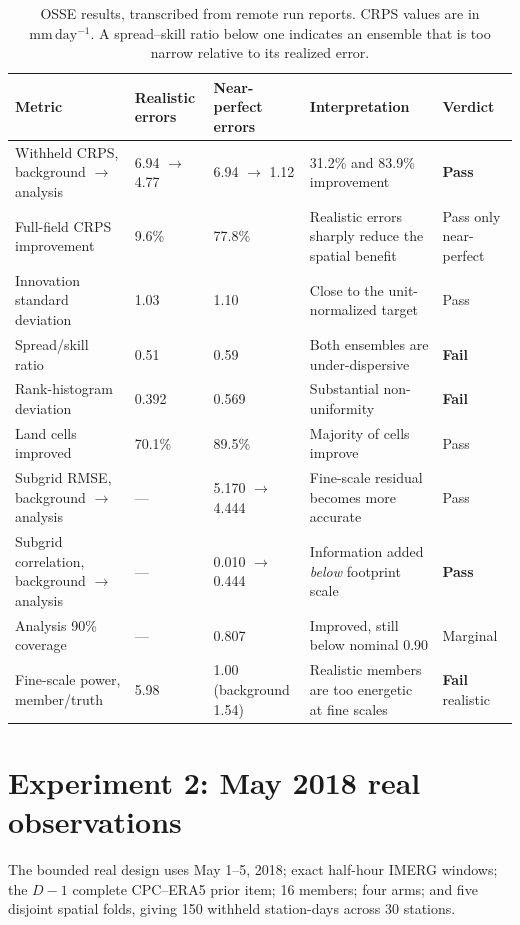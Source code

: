 \documentclass[10pt,twocolumn]{article}
\newcommand{\mmday}{\mathrm{mm\,day^{-1}}}
\begin{document}
\begin{table}[t]
\centering
\caption{OSSE results, transcribed from remote run reports. CRPS values are in
$\mmday$. A spread--skill ratio below one indicates an ensemble that is too
narrow relative to its realized error.}
\label{tab:osse}
\small
\begin{tabular}{L{0.21\textwidth}L{0.11\textwidth}L{0.12\textwidth}L{0.23\textwidth}L{0.17\textwidth}}
\toprule
Metric & Realistic errors & Near-perfect errors & Interpretation & Verdict \\
\midrule
Withheld CRPS, background $\rightarrow$ analysis & 6.94 $\rightarrow$ 4.77 & 6.94 $\rightarrow$ 1.12 & 31.2\% and 83.9\% improvement & \textbf{Pass} \\
Full-field CRPS improvement & 9.6\% & 77.8\% & Realistic errors sharply reduce the spatial benefit & Pass only near-perfect \\
Innovation standard deviation & 1.03 & 1.10 & Close to the unit-normalized target & Pass \\
Spread/skill ratio & 0.51 & 0.59 & Both ensembles are under-dispersive & \textbf{Fail} \\
Rank-histogram deviation & 0.392 & 0.569 & Substantial non-uniformity & \textbf{Fail} \\
Land cells improved & 70.1\% & 89.5\% & Majority of cells improve & Pass \\
Subgrid RMSE, background $\rightarrow$ analysis & --- & 5.170 $\rightarrow$ 4.444 & Fine-scale residual becomes more accurate & Pass \\
Subgrid correlation, background $\rightarrow$ analysis & --- & 0.010 $\rightarrow$ 0.444 & Information added \emph{below} footprint scale & \textbf{Pass} \\
Analysis 90\% coverage & --- & 0.807 & Improved, still below nominal 0.90 & Marginal \\
Fine-scale power, member/truth & 5.98 & 1.00 (background 1.54) & Realistic members are too energetic at fine scales & \textbf{Fail} realistic \\
\bottomrule
\end{tabular}
\end{table}

\section{Experiment 2: May 2018 real observations}

The bounded real design uses May 1--5, 2018; exact half-hour IMERG windows;
the $D-1$ complete CPC--ERA5 prior item; 16 members; four arms; and five
disjoint spatial folds, giving 150 withheld station-days across 30 stations.
\end{document}
